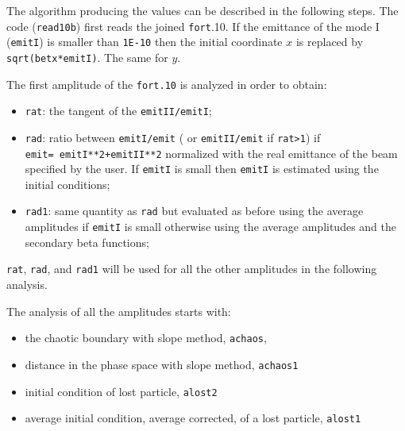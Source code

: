 \documentclass{cernatsnote}
\begin{document}


The algorithm producing the values can be described in the following steps.
The code ({\tt read10b}) first reads the joined {\tt fort}.10.  If the
emittance of the mode I ({\tt emitI}) is smaller than {\tt 1E-10} then the
initial coordinate $x$ is replaced by {\tt sqrt(betx*emitI)}. The same for
$y$.


The first amplitude of the {\tt fort.10} is analyzed in order to obtain:
\begin{itemize}
\item {\tt rat}: the tangent of the {\tt emitII/emitI};
\item {\tt rad}: ratio between {\tt emitI/emit} (
or {\tt emitII/emit} if {\tt rat>1}) if \\ {\tt emit=
emitI**2+emitII**2} normalized with the real emittance of the beam specified
by the user.  If {\tt emitI} is small then {\tt emitI} is estimated using the
initial conditions;
\item {\tt rad1}: same quantity as {\tt rad} but evaluated as before using the
average amplitudes if {\tt emitI} is small otherwise using the average
amplitudes and the secondary beta functions;
\end{itemize}

{\tt rat}, {\tt rad}, and {\tt rad1} will be used for all the other amplitudes
in the following analysis.


The analysis of all the amplitudes starts with:
\begin{itemize}
\item the chaotic boundary with slope method, {\tt achaos},
\item distance in the phase space with slope method, {\tt achaos1}
\item initial condition of lost particle, {\tt alost2}
\item average initial condition, average corrected, of a lost particle,
  {\tt alost1}
\end{itemize}
\end{document}
